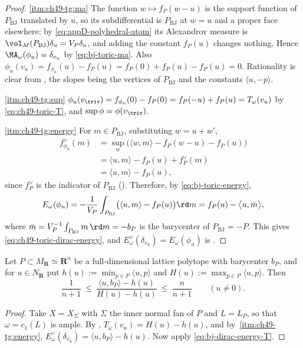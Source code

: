 \begin{proof}
\cref{itm:ch49-tg:ma}  The function $w\mapsto f_P(w-u)$ is the support
function of $P_{\mathrm{BJ}}$ translated by $u$, so its subdifferential
is $P_{\mathrm{BJ}}$ at $w=u$ and a proper face elsewhere; by
\eqref{eq:appD-polyhedral-atom} its Alexandrov measure is
$\vol_M(P_{\mathrm{BJ}})\delta_u=V_P\delta_u$, and adding the constant
$f_P(u)$ changes nothing.  Hence $\MA_\omega(\phi_u)=\delta_{v_u}$ by
\eqref{eq:bj-toric-ma}.  Also
$\phi_u(v_u)=f_{\phi_u}(u)-f_P(u)=f_P(0)+f_P(u)-f_P(u)=0$.  Rationality
is clear from , the slopes being the
vertices of $P_{\mathrm{BJ}}$ and the constants $\langle u,-p\rangle$.

\cref{itm:ch49-tg:sup}
$\phi_u(v_{\triv})=f_{\phi_u}(0)-f_P(0)=f_P(-u)+f_P(u)=T_\omega(v_u)$ by
\eqref{eq:ch49-toric-T}, and $\sup\phi=\phi(v_{\triv})$.

\cref{itm:ch49-tg:energy}  For $m\in P_{\mathrm{BJ}}$, substituting
$w=u+w'$,
\[
 \begin{aligned}
  f^\vee_{\phi_u}(m)
   &=\sup_{w}\bigl(\langle w,m\rangle-f_P(w-u)-f_P(u)\bigr)\\
   &=\langle u,m\rangle-f_P(u)+f_P^\vee(m)\\
   &=\langle u,m\rangle-f_P(u),
 \end{aligned}
\]
since $f_P^\vee$ is the indicator of $P_{\mathrm{BJ}}$
().  Therefore, by
\eqref{eq:bj-toric-energy},
\[
 E_\omega(\phi_u)
 =-\frac1{V_P}\int_{P_{\mathrm{BJ}}}\bigl(\langle u,m\rangle-f_P(u)\bigr)
   \rd m
 =f_P(u)-\bigl\langle u,\bar m\bigr\rangle,
\]
where $\bar m=V_P^{-1}\int_{P_{\mathrm{BJ}}}m\,\rd m=-b_P$ is the
barycenter of $P_{\mathrm{BJ}}=-P$.  This gives
\eqref{eq:ch49-toric-dirac-energy}, and
$E^\vee_\omega(\delta_{v_u})=E_\omega(\phi_u)$ is
.
\end{proof}

\begin{corollary}
\label{cor:ch49-minkowski}
Let $P\subset M_{\mathbf R}\simeq\mathbf R^n$ be a full-dimensional
lattice polytope with barycenter $b_P$, and for $u\in N_{\mathbf R}$
put $h(u):=\min_{p\in P}\langle u,p\rangle$ and
$H(u):=\max_{p\in P}\langle u,p\rangle$.  Then
\[
 \frac1{n+1}\ \le\
 \frac{\langle u,b_P\rangle-h(u)}{H(u)-h(u)}\ \le\ \frac n{n+1}
 \qquad (u\ne0).
\]
\end{corollary}

\begin{proof}
Take $X=X_\Sigma$ with $\Sigma$ the inner normal fan of $P$ and
$L=L_P$, so that $\omega=c_1(L)$ is ample.  By
, $T_\omega(v_u)=H(u)-h(u)$, and by
\,\cref{itm:ch49-tg:energy},
$E^\vee_\omega(\delta_{v_u})=\langle u,b_P\rangle-h(u)$.  Now apply
\eqref{eq:bj-dirac-energy-T}.
\end{proof}

